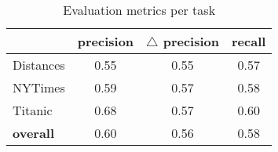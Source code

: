 \begin{table}
\caption{Evaluation metrics per task}
\label{tbl:comparison-task-wise}
\centering    
\begin{threeparttable}
\begin{tabular}{lccc}

& \textbf{precision} & $\triangle$ \textbf{precision} & \textbf{recall} \\ 
\hline

Distances & 0.55 & 0.55 & 0.57
\\

NYTimes  & 0.59 & 0.57 & 0.58
\\

Titanic & 0.68 & 0.57 & 0.60
\\

\hline


\textbf{overall} & 0.60 & 0.56 & 0.58
\\


\end{tabular}
\end{threeparttable}
\end{table}
